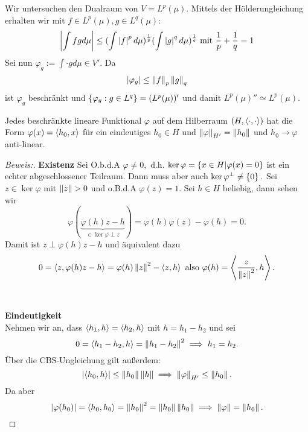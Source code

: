 \begin{ex}
    Wir untersuchen den Dualraum von $V = L^p(\mu).$ Mittels der Hölderungleichung erhalten wir mit $f \in L^p(\mu), g \in L^q(\mu)$: \[\left\lvert \int fg d \mu \right\rvert \leq (\int\left\lvert f \right\rvert^p d \mu)^{\frac{1}{p}}(\int\left\lvert g \right\rvert^q d \mu)^{\frac{1}{q}} \text{ mit } \frac{1}{p} + \frac{1}{q} = 1\] Sei nun $\varphi_g := \int \cdot g d \mu \in V'.$ Da \[\left\lvert \varphi_g \right\rvert \leq \left\lVert f\right\rVert_p \left\lVert g\right\rVert_q\] ist $\varphi_g$ beschränkt und $\left\{\varphi_g: g \in L^q\right\} = (L^p(\mu))'$ und damit $L^p(\mu)'' \simeq L^p(\mu).$
\end{ex}


\begin{theorem}\label{riez1} Jedes beschränkte   lineare Funktional $\varphi$ auf dem Hilberraum $(H, \left\langle\cdot, \cdot\right\rangle)$ hat die Form $\varphi(x)= \left\langle h_0,x\right\rangle$ für ein eindeutiges $h_0 \in H$ und $\left\lVert\varphi\right\rVert_{H'} = \left\lVert h_0\right\rVert$ und $h_0 \to \varphi$ anti-linear.

\begin{proof}[Beweis:]
\textbf{Existenz}
Sei O.b.d.A $\varphi \not= 0,$ d.h. $\ker \varphi = \left\{x \in H | \varphi(x) = 0\right\}$ ist ein echter abgeschlossener Teilraum. Dann muss aber auch $\ker{\varphi^{\perp}} \not= \left\{0\right\}.$ Sei $z \in \ker{\varphi}$ mit $\left\lVert z\right\rVert>0$ und o.B.d.A $\varphi(z) = 1.$ Sei $h \in H$ beliebig, dann sehen wir \[ \varphi(\underbrace{\varphi(h)z-h}_{\in \ker\varphi \perp z}) = \varphi(h)\varphi(z)-\varphi(h) = 0.\] Damit ist $z \perp \varphi(h)z - h$ und äquivalent dazu \[0 = \left\langle z, \varphi(h)z-h\right\rangle = \varphi(h)\left\lVert z\right\rVert^2-\left\langle z,h\right\rangle \text{ also } \varphi(h) = \left\langle\frac{z}{\left\lVert z\right\rVert^2}, h\right\rangle.\] \\ \\\textbf{Eindeutigkeit} \\
Nehmen wir an, dass $\left\langle h_1, h\right\rangle = \left\langle h_2, h\right\rangle$ mit $h = h_1 - h_2$ und sei \[0 = \left\langle h_1 - h_2, h\right\rangle = \left\lVert h_1 - h_2\right\rVert^2 \implies h_1 = h_2.\] Über die CBS-Ungleichung gilt außerdem: \[\left\lvert \left\langle h_0, h\right\rangle \right\rvert \leq \left\lVert h_0\right\rVert\left\lVert h\right\rVert \implies \left\lVert\varphi\right\rVert_{H'} \leq \left\lVert h_0\right\rVert.\] Da aber \[\left\lvert \varphi(h_0) \right\rvert = \left\langle h_0, h_0\right\rangle = \left\lVert h_0\right\rVert^2 = \left\lVert h_0\right\rVert\left\lVert h_0\right\rVert \implies \left\lVert\varphi\right\rVert = \left\lVert h_0\right\rVert.\]
\end{proof}
\end{theorem}

